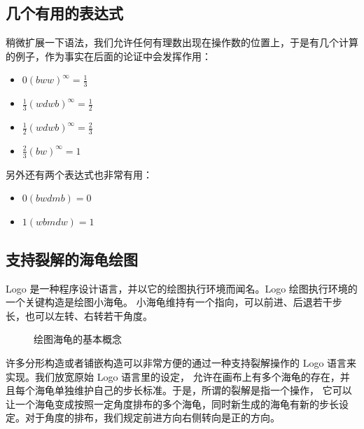 \documentclass[a4paper,12pt]{article}
\begin{document}
\subsection{几个有用的表达式}

稍微扩展一下语法，我们允许任何有理数出现在操作数的位置上，于是有几个计算的例子，作为事实在后面的论证中会发挥作用：

\begin{itemize}
\item $0(bww)^\infty = \frac{1}{3}$
\item $\frac{1}{3}(wdwb)^\infty = \frac{1}{2}$
\item $\frac{1}{2}(wdwb)^\infty = \frac{2}{3}$
\item $\frac{2}{3}(bw)^\infty = 1$
\end{itemize}

另外还有两个表达式也非常有用：

\begin{itemize}
\item $0(bwdmb) = 0$
\item $1(wbmdw) = 1$
\end{itemize}

\subsection{支持裂解的海龟绘图}

Logo 是一种程序设计语言，并以它的绘图执行环境而闻名。Logo 绘图执行环境的一个关键构造是绘图小海龟。
小海龟维持有一个指向，可以前进、后退若干步长，也可以左转、右转若干角度。

\begin{figure}[ht]
\centering
{}
\caption{绘图海龟的基本概念}
\end{figure}

许多分形构造或者铺嵌构造可以非常方便的通过一种支持裂解操作的 Logo 语言来实现。我们放宽原始 Logo 语言里的设定，
允许在画布上有多个海龟的存在，并且每个海龟单独维护自己的步长标准。于是，所谓的裂解是指一个操作，
它可以让一个海龟变成按照一定角度排布的多个海龟，同时新生成的海龟有新的步长设定。对于角度的排布，我们规定前进方向右侧转向是正的方向。
\end{document}
